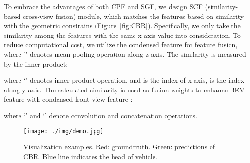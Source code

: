 \documentclass[letterpaper, 10 pt, conference]{ieeeconf}
\begin{document}
To embrace the advantages of both CPF and SGF, we design SCF (similarity-based cross-view fusion) module, which matches the features based on similarity with the geometric constrains (Figure~\ref{fig:CBR}). Specifically, we only take the similarity among the features with the same x-axis value into consideration. To reduce computational cost, we utilize the condensed feature  for feature fusion, where `' denotes mean pooling operation along z-axis. The similarity  is measured by the inner-product:

where `' denotes inner-product operation, and  is the index of x-axis,  is the index along 
y-axis. The calculated similarity is used as fusion weights to enhance BEV feature  with condensed front view feature :

where `' and `' denote convolution and concatenation operations.

\begin{figure*}
  \centering
  \texttt{[image: ./img/demo.jpg]}
  \caption{Visualization examples. Red: groundtruth. Green: predictions of CBR. Blue line indicates the head of vehicle.}
  \label{fig:demo}
\end{figure*}
\end{document}
